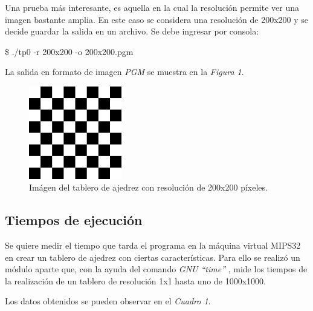 \documentclass{article}
\begin{document}
	Una prueba más interesante, es aquella en la cual la resolución permite ver una imagen bastante amplia. En este caso se considera una resolución de 200x200 y se decide guardar la salida en un archivo. Se debe ingresar por consola:
	\bigskip

{\ttfamily\footnotesize
\indent \$ ./tp0 -r 200x200 -o 200x200.pgm\\}
\smallskip

	La salida en formato de imagen \textit{PGM} se muestra en la \textit{Figura 1}.


\newpage
\begin{figure}[H]
	\centering
	\includegraphics[width=0.36\textwidth]{images/200x200.jpg}
	\medskip
	\caption{Imágen del tablero de ajedrez con resolución de 200x200 píxeles.}
\end{figure}
\bigskip\bigskip


\subsection{Tiempos de ejecución}

	\par
	Se quiere medir el tiempo que tarda el programa en la máquina virtual MIPS32 en crear un tablero de ajedrez con ciertas características. Para ello se realizó un módulo aparte que, con la ayuda del comando \textit{GNU ``time''} \cite{TIME}, mide los tiempos de la realización de un tablero de resolución 1x1 hasta uno de 1000x1000. 
	\par
	Los datos obtenidos se pueden observar en el \textit{Cuadro 1}. 
	\bigskip\bigskip
\end{document}
